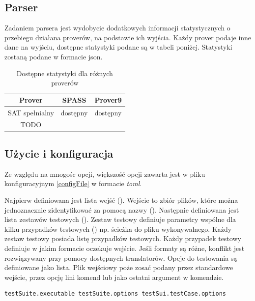 \documentclass[a4paper,12pt]{article}
\begin{document}
\subsection{Parser} \label{parser}

Zadaniem parsera jest wydobycie dodatkowych informacji statystycznych o przebiegu działana proverów, na podstawie ich wyjścia.
\newline
Każdy prover podaje inne dane na wyjściu, dostępne statystyki podane są w tabeli poniżej.
\newline
Statystyki zostaną podane w formacie json.

\begin{table}[ht]
  \centering
  \caption{Dostępne statystyki dla różnych proverów}
  \begin{tabular}{ |c|c|c| }
    \hline
    Prover & SPASS & Prover9 \\
    \hline
    SAT spełnialny & dostępny & dostępny \\
    \hline
    TODO & & \\
    \hline
  \end{tabular}
\end{table}

\subsection{Użycie i konfiguracja} \label{benchmarkUsage}

Ze względu na mnogośc opcji, większość opcji zawarta jest w pliku konfiguracyjnym \ref{configFile} w formacie \textit{toml}.

Najpierw definiowana jest lista wejść (). Wejście to zbiór plików, które można jednoznacznie zidentyfikować za pomocą nazwy ().
Następnie definiowana jest lista zestawów testowych (). Zestaw testowy definiuje parametry wspólne dla kilku przypadków testowych () np. ścieżka do pliku wykonywalnego. Każdy zestaw testowy posiada listę przypadków testowych. Każdy przypadek testowy definiuje w jakim formacie oczekuje wejście. Jeśli formaty są różne, konflikt jest rozwiązywany przy pomocy dostępnych translatorów. Opcje do testowania są definiowane jako lista. Plik wejściowy poże zosać podany przez standardowe wejście, przez opcję lini komend lub jako ostatni argument w komendzie.

\begin{verbatim}
testSuite.executable testSuite.options testSui.testCase.options
\end{verbatim}
\end{document}
